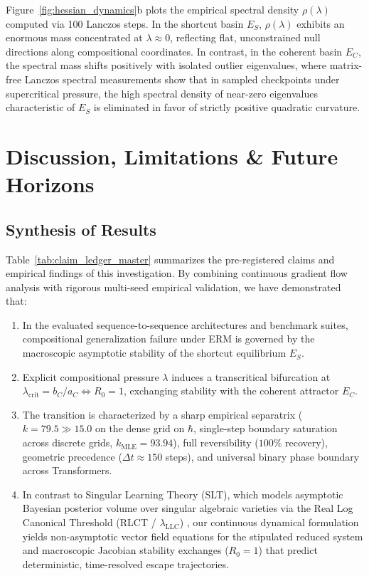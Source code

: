 \documentclass{article}
\theoremstyle{plain}
\theoremstyle{definition}
\begin{document}
Figure~\ref{fig:hessian_dynamics}b plots the empirical spectral density $\rho(\lambda)$ computed via 100 Lanczos steps. In the shortcut basin $E_S$, $\rho(\lambda)$ exhibits an enormous mass concentrated at $\lambda \approx 0$, reflecting flat, unconstrained null directions along compositional coordinates. In contrast, in the coherent basin $E_C$, the spectral mass shifts positively with isolated outlier eigenvalues, where matrix-free Lanczos spectral measurements show that in sampled checkpoints under supercritical pressure, the high spectral density of near-zero eigenvalues characteristic of $E_S$ is eliminated in favor of strictly positive quadratic curvature.

\section{Discussion, Limitations \& Future Horizons}
\label{sec:discussion}

\subsection{Synthesis of Results}
Table~\ref{tab:claim_ledger_master} summarizes the pre-registered claims and empirical findings of this investigation. By combining continuous gradient flow analysis with rigorous multi-seed empirical validation, we have demonstrated that:
\begin{enumerate}[leftmargin=*,noitemsep]
    \item In the evaluated sequence-to-sequence architectures and benchmark suites, compositional generalization failure under ERM is governed by the macroscopic asymptotic stability of the shortcut equilibrium $E_S$.
    \item Explicit compositional pressure $\lambda$ induces a transcritical bifurcation at $\lambda_{\text{crit}} = b_C / a_C \iff R_0 = 1$, exchanging stability with the coherent attractor $E_C$.
    \item The transition is characterized by a sharp empirical separatrix ($k = 79.5 \gg 15.0$ on the dense grid on $\hbar$, single-step boundary saturation across discrete grids, $k_{\text{MLE}} = 93.94$), full reversibility ($100\%$ recovery), geometric precedence ($\Delta t \approx 150$ steps), and universal binary phase boundary across Transformers.
    \item In contrast to Singular Learning Theory (SLT), which models asymptotic Bayesian posterior volume over singular algebraic varieties via the Real Log Canonical Threshold (RLCT / $\lambda_{\text{LLC}}$) \citep{Watanabe2009Algebraic,Lau2023Quantifying}, our continuous dynamical formulation yields non-asymptotic vector field equations for the stipulated reduced system and macroscopic Jacobian stability exchanges ($R_0 = 1$) that predict deterministic, time-resolved escape trajectories.
\end{enumerate}
\end{document}

